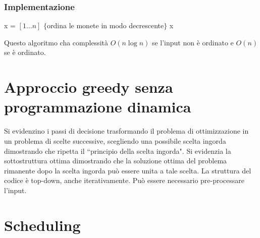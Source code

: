 \subsubsection{Implementazione}
\begin{algorithm}[H]
\DontPrintSemicolon
{}






\SetKwFunction{}{}
\SetKwFunction{}{}
\SetKwFunction{}{}
\SetKwFunction{}{}
\SetKwFunction{}{}


\caption{\protect\Int[] \protect{}}
\Int[] x = \New \Int$[1\dots n]$\;
$\{$ordina le monete in modo decrescente$\}$\;
\Return x\;
\end{algorithm}
Questo algoritmo cha complessit\`a $O(n\log n)$ se l'input non \`e ordinato e $O(n)$ se \`e ordinato.
\section{Approccio greedy senza programmazione dinamica}
Si evidenzino i passi di decisione trasformando il problema di ottimizzazione in un problema di scelte successive, scegliendo una possibile scelta ingorda dimostrando che ripetta il
``principio della scelta ingorda". Si evidenzia la sottostruttura ottima dimostrando che la soluzione ottima del problema rimanente dopo la scelta ingorda pu\`o essere unita a tale
scelta. La struttura del codice \`e top-down, anche iterativamente. Pu\`o essere necessario pre-processare l'input. 
\section{Scheduling}
